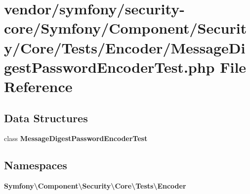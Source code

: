 \section{vendor/symfony/security-\/core/\+Symfony/\+Component/\+Security/\+Core/\+Tests/\+Encoder/\+Message\+Digest\+Password\+Encoder\+Test.php File Reference}
\label{_message_digest_password_encoder_test_8php}
\subsection*{Data Structures}
\begin{DoxyCompactItemize}
\item 
class {\bf Message\+Digest\+Password\+Encoder\+Test}
\end{DoxyCompactItemize}
\subsection*{Namespaces}
\begin{DoxyCompactItemize}
\item 
 {\bf Symfony\textbackslash{}\+Component\textbackslash{}\+Security\textbackslash{}\+Core\textbackslash{}\+Tests\textbackslash{}\+Encoder}
\end{DoxyCompactItemize}
